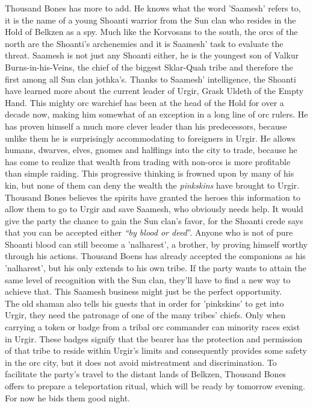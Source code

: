Thousand Bones has more to add. He knows what the word 'Saamesh' refers to, it is the name of a young Shoanti warrior from the Sun clan who resides in the Hold of Belkzen as a spy. Much like the Korvosans to the south, the orcs of the north are the Shoanti's archenemies and it is Saamesh' task to evaluate the threat. Saamesh is not just any Shoanti either, he is the youngest son of Valkur Burns-in-his-Veins, the chief of the biggest Sklar-Quah tribe and therefore the first among all Sun clan jothka's. Thanks to Saamesh' intelligence, the Shoanti have learned more about the current leader of Urgir, Grask Uldeth of the Empty Hand. This mighty orc warchief has been at the head of the Hold for over a decade now, making him somewhat of an exception in a long line of orc rulers. He has proven himself a much more clever leader than his predecessors, because unlike them he is surprisingly accommodating to foreigners in Urgir. He allows humans, dwarves, elves, gnomes and halflings into the city to trade, because he has come to realize that wealth from trading with non-orcs is more profitable than simple raiding. This progressive thinking is frowned upon by many of his kin, but none of them can deny the wealth the {\itshape pinkskins} have brought to Urgir. Thousand Bones believes the spirits have granted the heroes this information to allow them to go to Urgir and save Saamesh, who obviously needs help. It would give the party the chance to gain the Sun clan's favor, for the Shoanti crede says that you can be accepted either {\itshape``by blood or deed}''. Anyone who is not of pure Shoanti blood can still become a 'nalharest', a brother, by proving himself worthy through his actions. Thousand Boens has already accepted the companions as his 'nalharest', but his only extends to his own tribe. If the party wants to attain the same level of recognition with the Sun clan, they'll have to find a new way to achieve that. This Saamesh business might just be the perfect opportunity.\\

The old shaman also tells his guests that in order for 'pinkskins' to get into Urgir, they need the patronage of one of the many tribes' chiefs. Only when carrying a token or badge from a tribal orc commander can minority races exist in Urgir. These badges signify that the bearer has the protection and permission of that tribe to reside within Urgir's limits and consequently provides some safety in the orc city, but it does not avoid mistreatment and discrimination. To facilitate the party's travel to the distant lands of Belkzen, Thousand Bones offers to prepare a teleportation ritual, which will be ready by tomorrow evening. For now he bids them good night.\\

